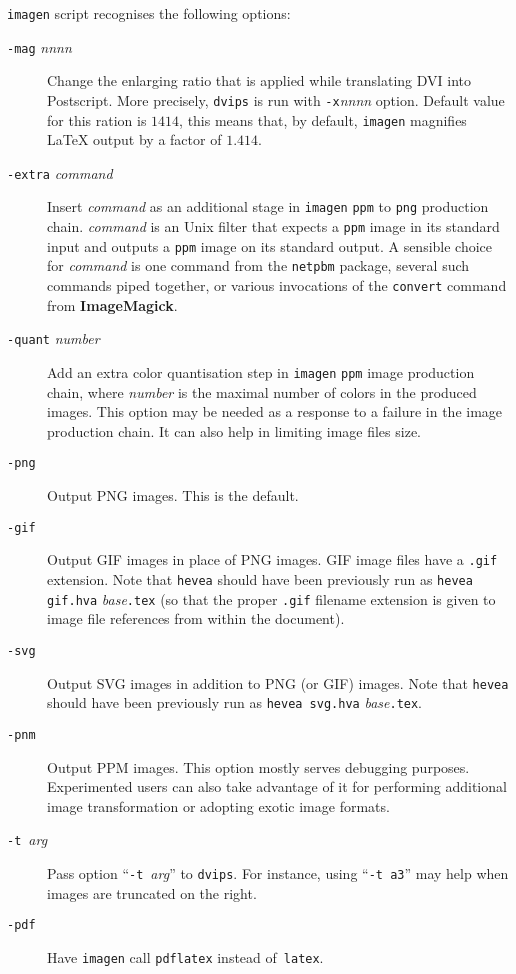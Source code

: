  \texttt{imagen} script recognises the following options:
\begin{description}
\item[{\tt -mag} {\sl nnnn}] Change the enlarging ratio that is applied
while translating DVI into Postscript.
More precisely,  \texttt{dvips} is run with \texttt{-x}{\sl nnnn}
option.
Default value for this ration is $1414$, this means
that, by default, \texttt{imagen} magnifies \LaTeX{} output by a factor of
$1.414$.
\item[{\tt -extra} {\it command}] Insert {\it command} as an additional
stage in \texttt{imagen} \texttt{ppm} to \texttt{png} production chain.
\textit{command} is an Unix filter that expects a \texttt{ppm} image
in its standard input and outputs a \texttt{ppm} image on its standard output.
A sensible choice for \textit{command} is one command from the
\texttt{netpbm} package, several such commands piped together, or
various invocations of the \texttt{convert} command from \textbf{ImageMagick}.
\item[{\tt -quant} {\it number}] Add an extra color quantisation step
in \texttt{imagen} \texttt{ppm} image production chain, where
\textit{number} is the maximal number of colors in the produced
images. This option may be needed as a response to a failure in the
image production chain. It can also help in limiting image files size.
\item[{\tt -png}] Output PNG images. This is the default.
\item[{\tt -gif}]
Output GIF images in place of PNG images.
GIF image files have a \texttt{.gif} extension.
Note that \texttt{hevea} should have been previously run as
\texttt{hevea gif.hva} \textit{base}\texttt{.tex} (so that the proper
\texttt{.gif} filename
extension is given to image file references from within the \html{}
document).
\item[{\tt -svg}]
Output SVG images in addition to PNG (or GIF) images.
Note that \texttt{hevea} should have been previously run as
\texttt{hevea svg.hva} \textit{base}\texttt{.tex}.
\item[{\tt -pnm}] Output PPM images. This option mostly serves
debugging purposes. Experimented users can also take advantage
of it for performing additional image transformation or
adopting exotic image formats.
\item[{\tt -t}~{\it arg}] Pass option ``{\tt -t}~{\it arg}'' to
\texttt{dvips}.
For instance, using ``\texttt{-t a3}'' may help when images are
truncated on the right.
\item[{\tt -pdf}]
Have \texttt{imagen} call \texttt{pdflatex} instead
of~\texttt{latex}.
\end{description}

